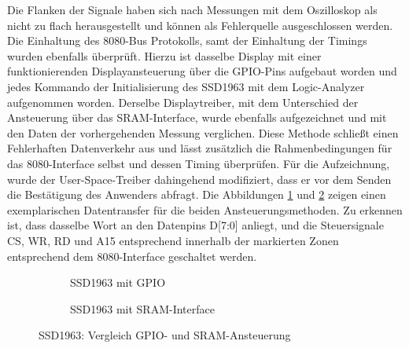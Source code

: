 Die Flanken der Signale haben sich nach Messungen mit dem Oszilloskop als nicht zu flach herausgestellt und können als Fehlerquelle ausgeschlossen werden. Die Einhaltung des 8080-Bus Protokolls, samt der Einhaltung der Timings wurden ebenfalls überprüft. Hierzu ist dasselbe Display mit einer funktionierenden Displayansteuerung über die GPIO-Pins aufgebaut worden und jedes Kommando der Initialisierung des SSD1963 mit dem Logic-Analyzer aufgenommen worden. Derselbe Displaytreiber, mit dem Unterschied der Ansteuerung über das SRAM-Interface, wurde ebenfalls aufgezeichnet und mit den Daten der vorhergehenden Messung verglichen. Diese Methode schließt einen Fehlerhaften Datenverkehr aus und lässt zusätzlich die Rahmenbedingungen für das 8080-Interface selbst und dessen Timing überprüfen. Für die Aufzeichnung, wurde der User-Space-Treiber dahingehend modifiziert, dass er vor dem Senden die Bestätigung des Anwenders abfragt. Die Abbildungen \ref{fig:ssd1963_gpio} und \ref{fig:ssd1963_sram} zeigen einen exemplarischen Datentransfer für die beiden Ansteuerungsmethoden. Zu erkennen ist, dass dasselbe Wort an den Datenpins D[7:0] anliegt, und die Steuersignale CS, WR, RD und A15 entsprechend innerhalb der markierten Zonen entsprechend dem 8080-Interface geschaltet werden. 

\begin{figure}[htp]
        \begin{center}
        \begin{subfigure}[htp]{1\textwidth}
			\centering
	\caption{SSD1963 mit GPIO}
			\label{fig:ssd1963_gpio}
		\end{subfigure}


        \begin{subfigure}[htp]{1\textwidth}
	\centering
{}
	\caption{SSD1963 mit SRAM-Interface}
	\label{fig:ssd1963_sram}
\end{subfigure}

		\end{center}
\caption{SSD1963: Vergleich GPIO- und SRAM-Ansteuerung}
	\label{fig:ssd1963_gpio_sram}
\end{figure}

